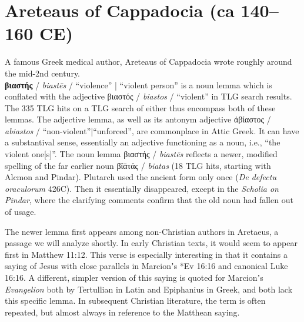 %
%
\chapter{Areteaus of Cappadocia (ca 140--160 CE)}%
\justifying%
\vspace*{3mm}%
%
\noindent{}A famous Greek medical author, Areteaus of Cappadocia wrote roughly around the mid-2nd century. \\[1.5mm]

\noindent{}\textbf{βιαστής} / \textit{biastēs} / “violence” | “violent person” %
is a noun lemma which is conflated with the adjective βιαστός / %
\textit{biastos} / “violent” in TLG search results. %
The 335 TLG hits on a TLG search of either thus encompass both of these lemmas. %
The adjective lemma, as well as its antonym adjective ἀβίαστος / %
\textit{abiastos} / “non-violent”|“unforced”, are commonplace in Attic Greek. %
It can have a substantival sense, essentially an adjective functioning as a noun, %
i.e., “the violent one[s]”. %
The noun lemma βιαστής / \textit{biastēs} reflects a newer, %
modified spelling of the far earlier noun βῐᾱτάς / \textit{biatas} %
(18 TLG hits, starting with Alcmon and Pindar). %
Plutarch used the ancient form only once (\textit{De defectu oraculorum} 426C). %
Then it essentially disappeared, except in the \textit{Scholia on Pindar}, %
where the clarifying comments confirm that the old noun had fallen out of usage.

The newer lemma first appears among non-Christian authors in Aretaeus, %
a passage we will analyze shortly. %
In early Christian texts, it would seem to appear first %
in Matthew 11:12. %
This verse is especially interesting in that it contains a saying of Jesus with %
close parallels in Marcionʼs *Ev 16:16 and canonical Luke 16:16. %
A different, simpler version of this saying is quoted for Marcionʼs \textit{Evangelion} %
both by Tertullian in Latin and Epiphanius in Greek, and both lack this specific lemma. %
In subsequent Christian literature, the term is often repeated, %
but almost always in reference to the Matthean saying. %

